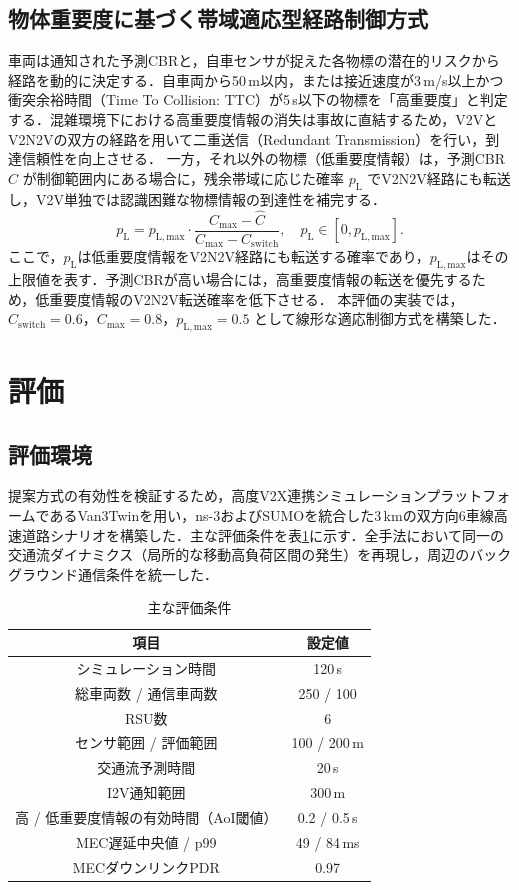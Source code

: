 \documentclass[a4paper,10pt,twocolumn,uplatex]{jsarticle}
\begin{document}
\subsection{物体重要度に基づく帯域適応型経路制御方式}
車両は通知された予測CBRと，自車センサが捉えた各物標の潜在的リスクから経路を動的に決定する．自車両から50\,m以内，または接近速度が3\,m/s以上かつ衝突余裕時間（Time To Collision: TTC）が5\,s以下の物標を「高重要度」と判定する．混雑環境下における高重要度情報の消失は事故に直結するため，V2VとV2N2Vの双方の経路を用いて二重送信（Redundant Transmission）を行い，到達信頼性を向上させる．
一方，それ以外の物標（低重要度情報）は，予測CBR $\hat{C}$ が制御範囲内にある場合に，残余帯域に応じた確率 $p_{\mathrm{L}}$ でV2N2V経路にも転送し，V2V単独では認識困難な物標情報の到達性を補完する．
\begin{equation}
p_{\mathrm{L}} =
p_{\mathrm{L,max}}
\cdot
\frac{C_{\max}-\hat{C}}
     {C_{\max}-C_{\mathrm{switch}}},
\quad
p_{\mathrm{L}} \in [0,p_{\mathrm{L,max}}].
\end{equation}
ここで，$p_{\mathrm{L}}$は低重要度情報をV2N2V経路にも転送する確率であり，$p_{\mathrm{L,max}}$はその上限値を表す．予測CBRが高い場合には，高重要度情報の転送を優先するため，低重要度情報のV2N2V転送確率を低下させる．
本評価の実装では，$C_{\mathrm{switch}}=0.6$，$C_{\max}=0.8$，$p_{\mathrm{L,max}}=0.5$ として線形な適応制御方式を構築した．

\section{評価}

\subsection{評価環境}
提案方式の有効性を検証するため，高度V2X連携シミュレーションプラットフォームであるVan3Twinを用い，ns-3およびSUMOを統合した3\,kmの双方向6車線高速道路シナリオを構築した．主な評価条件を表\ref{tab:condition}に示す．全手法において同一の交通流ダイナミクス（局所的な移動高負荷区間の発生）を再現し，周辺のバックグラウンド通信条件を統一した．

\begin{table}[t]
\centering
\caption{主な評価条件}
\label{tab:condition}
\small
\begin{tabular}{cc}
\hline
項目 & 設定値 \\ \hline \hline
シミュレーション時間 & 120\,s \\
総車両数 / 通信車両数 & 250 / 100 \\
RSU数 & 6 \\
センサ範囲 / 評価範囲 & 100 / 200\,m \\
交通流予測時間 & 20\,s \\
I2V通知範囲 & 300\,m \\
高 / 低重要度情報の有効時間（AoI閾値） & 0.2 / 0.5\,s \\
MEC遅延中央値 / p99 & 49 / 84\,ms \\
MECダウンリンクPDR & 0.97 \\ \hline
\end{tabular}
\end{table}
\end{document}
